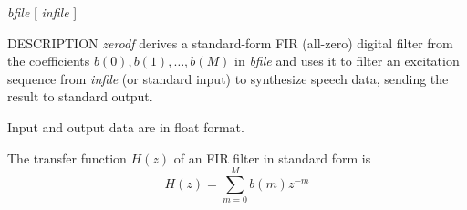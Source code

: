 % 
% 
% 
% 
%                                                                        
%

\begin{synopsis}
\item[zerodf] [ --m $M$ ] [ --p $P$ ] [ --i $I$ ] [ --t ] [ --k ]
		{\em bfile} [ {\em infile} ]
\end{synopsis}

\begin{qsection}{DESCRIPTION}
{\em zerodf} derives a standard-form FIR (all-zero) digital filter 
from the coefficients $b(0), b(1), \ldots, b(M)$ in {\em bfile} 
and uses it to filter an excitation sequence 
from {\em infile} (or standard input) to synthesize speech data, 
sending the result to standard output.

Input and output data are in float format.

The transfer function $H(z)$ of an FIR filter in standard form is
\begin{displaymath}
H(z) = \sum_{m=0}^{M} b(m) z^{-m}
\end{displaymath}
\end{qsection}

